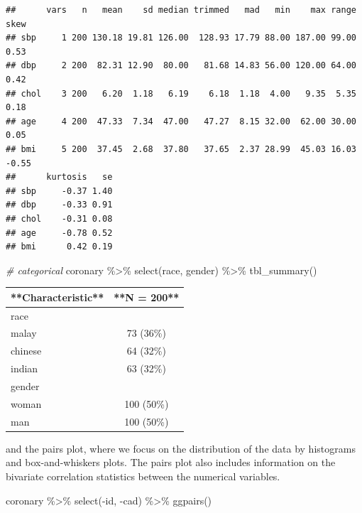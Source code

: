 \documentclass[
  10pt,
]{krantz}
\newenvironment{Shaded}{\begin{snugshade}}{\end{snugshade}}
\newcommand{\CommentTok}[1]{\textcolor[rgb]{0.56,0.35,0.01}{\textit{#1}}}
\newcommand{\FunctionTok}[1]{\textcolor[rgb]{0.00,0.00,0.00}{#1}}
\newcommand{\NormalTok}[1]{#1}
\newcommand{\SpecialCharTok}[1]{\textcolor[rgb]{0.00,0.00,0.00}{#1}}
\begin{document}
\begin{verbatim}
##      vars   n   mean    sd median trimmed   mad   min    max range  skew
## sbp     1 200 130.18 19.81 126.00  128.93 17.79 88.00 187.00 99.00  0.53
## dbp     2 200  82.31 12.90  80.00   81.68 14.83 56.00 120.00 64.00  0.42
## chol    3 200   6.20  1.18   6.19    6.18  1.18  4.00   9.35  5.35  0.18
## age     4 200  47.33  7.34  47.00   47.27  8.15 32.00  62.00 30.00  0.05
## bmi     5 200  37.45  2.68  37.80   37.65  2.37 28.99  45.03 16.03 -0.55
##      kurtosis   se
## sbp     -0.37 1.40
## dbp     -0.33 0.91
## chol    -0.31 0.08
## age     -0.78 0.52
## bmi      0.42 0.19
\end{verbatim}

\begin{Shaded}
\begin{Highlighting}[]
\CommentTok{\# categorical}
\NormalTok{coronary }\SpecialCharTok{\%\textgreater{}\%} \FunctionTok{select}\NormalTok{(race, gender) }\SpecialCharTok{\%\textgreater{}\%} \FunctionTok{tbl\_summary}\NormalTok{()}
\end{Highlighting}
\end{Shaded}

\begin{tabular}{l|c}
\hline
**Characteristic** & **N = 200**\\
\hline
race & \\
\hline
malay & 73 (36\%)\\
\hline
chinese & 64 (32\%)\\
\hline
indian & 63 (32\%)\\
\hline
gender & \\
\hline
woman & 100 (50\%)\\
\hline
man & 100 (50\%)\\
\hline
\end{tabular}

and the pairs plot, where we focus on the distribution of the data by histograms and box-and-whiskers plots. The pairs plot also includes information on the bivariate correlation statistics between the numerical variables.

\begin{Shaded}
\begin{Highlighting}[]
\NormalTok{coronary }\SpecialCharTok{\%\textgreater{}\%} \FunctionTok{select}\NormalTok{(}\SpecialCharTok{{-}}\NormalTok{id, }\SpecialCharTok{{-}}\NormalTok{cad) }\SpecialCharTok{\%\textgreater{}\%} \FunctionTok{ggpairs}\NormalTok{()}
\end{Highlighting}
\end{Shaded}
\end{document}
